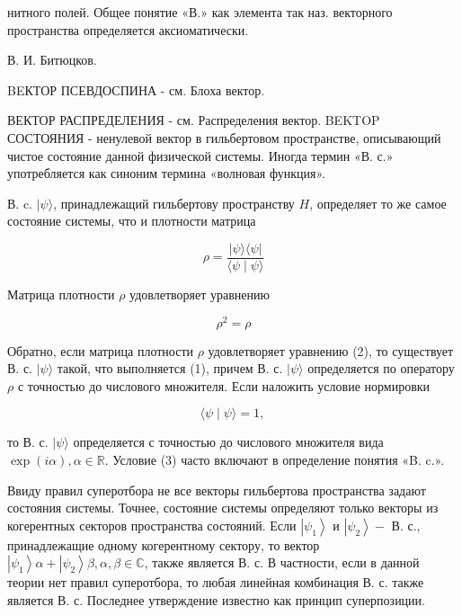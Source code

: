 \documentclass[10pt]{article}
\begin{document}
нитного полей. Общее понятие «В.» как элемента так наз. векторного пространства определяется аксиоматически.



В. И. Битюцков.



BEКТОР ПСЕВДОСПИНА - см. Блоха вектор.



ВЕКТОР РАСПРЕДЕЛЕНИЯ - см. Распределения вектор. BEKTOP СОСТОЯНИЯ - ненулевой вектор в гильбертовом пространстве, описывающий чистое состояние данной физической системы. Иногда термин «В. с.» употребляется как синоним термина «волновая функция».



В. c. $|\psi\rangle$, принадлежащий гильбертову пространству $H$, определяет то же самое состояние системы, что и плотности матрица



\[

\rho=\frac{|\psi\rangle\langle\psi|}{\langle\psi \mid \psi\rangle}

\]



Матрица плотности $\rho$ удовлетворяет уравнению



\[

\rho^{2}=\rho

\]



Обратно, если матрица плотности $\rho$ удовлетворяет уравнению (2), то существует В. с. $|\psi\rangle$ такой, что выполняется (1), причем В. с. $|\psi\rangle$ определяется по оператору $\rho$ с точностью до числового множителя. Если наложить условие нормировки



\[

\langle\psi \mid \psi\rangle=1 \text {, }

\]



то В. с. $|\psi\rangle$ определяется с точностью до числового множителя вида $\exp (i \alpha), \alpha \in \mathbb{R}$. Условие (3) часто включают в определение понятия «B. c.».



Ввиду правил суперотбора не все векторы гильбертова пространства задают состояния системы. Точнее, состояние системы определяют только векторы из когерентных секторов пространства состояний. Если $\left|\psi_{1}\right\rangle$ и $\left|\psi_{2}\right\rangle-$ В. с., принадлежащие одному когерентному сектору, то вектор $\left|\psi_{1}\right\rangle \alpha+\left|\psi_{2}\right\rangle \beta, \alpha, \beta \in \mathbb{C}$, также является В. с. В частности, если в данной теории нет правил суперотбора, то любая линейная комбинация В. с. также является В. с. Последнее утверждение известно как принцип суперпозиции.
\end{document}
